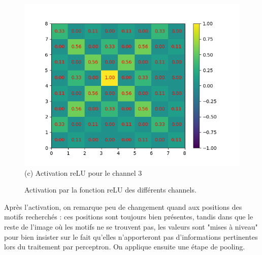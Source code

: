 \begin{figure}[h]
    \endminipage\hfill
        \includegraphics[width=\textwidth]{img/cnn_exemple/cross/activation_relu_3.png}
        \center
        (c) Activation reLU pour le channel 3
    \endminipage 
    \caption{Activation par la fonction reLU des différents channels.}
\end{figure}

Après l'activation, on remarque peu de changement quand aux positions des motifs recherchés : 
ces positions sont toujours bien présentes, tandis dans que le reste de l'image où les motifs ne se trouvent pas, 
les valeurs sont "mises à niveau" pour bien insister sur le fait qu'elles n'apporteront pas d'informations pertinentes 
lors du traitement par perceptron.
On applique ensuite une étape de pooling.

\newpage

